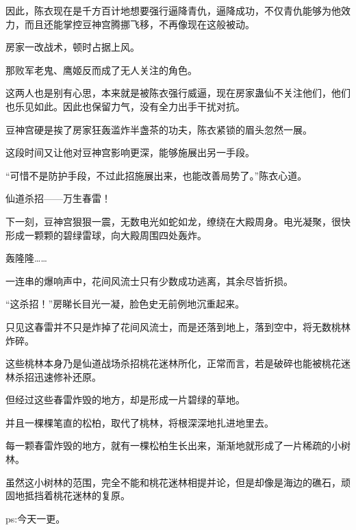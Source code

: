 \begin{this_body}
因此，陈衣现在是千方百计地想要强行逼降青仇，逼降成功，不仅青仇能够为他效力，而且还能掌控豆神宫腾挪飞移，不再像现在这般被动。

房家一改战术，顿时占据上风。

那败军老鬼、鹰姬反而成了无人关注的角色。

这两人也是别有心思，本来就是被陈衣强行威逼，现在房家蛊仙不关注他们，他们也乐见如此。因此也保留力气，没有全力出手干扰对抗。

豆神宫硬是挨了房家狂轰滥炸半盏茶的功夫，陈衣紧锁的眉头忽然一展。

这段时间又让他对豆神宫影响更深，能够施展出另一手段。

“可惜不是防护手段，不过此招施展出来，也能改善局势了。”陈衣心道。

仙道杀招——万生春雷！

下一刻，豆神宫狠狠一震，无数电光如蛇如龙，缭绕在大殿周身。电光凝聚，很快形成一颗颗的碧绿雷球，向大殿周围四处轰炸。

轰隆隆……

一连串的爆响声中，花间风流士只有少数成功逃离，其余尽皆折损。

“这杀招！”房睇长目光一凝，脸色史无前例地沉重起来。

只见这春雷并不只是炸掉了花间风流士，而是还落到地上，落到空中，将无数桃林炸碎。

这些桃林本身乃是仙道战场杀招桃花迷林所化，正常而言，若是破碎也能被桃花迷林杀招迅速修补还原。

但经过这些春雷炸毁的地方，却是形成一片碧绿的草地。

并且一棵棵笔直的松柏，取代了桃林，将根深深地扎进地里去。

每一颗春雷炸毁的地方，就有一棵松柏生长出来，渐渐地就形成了一片稀疏的小树林。

虽然这小树林的范围，完全不能和桃花迷林相提并论，但是却像是海边的礁石，顽固地抵挡着桃花迷林的复原。

ps:今天一更。

\end{this_body}

